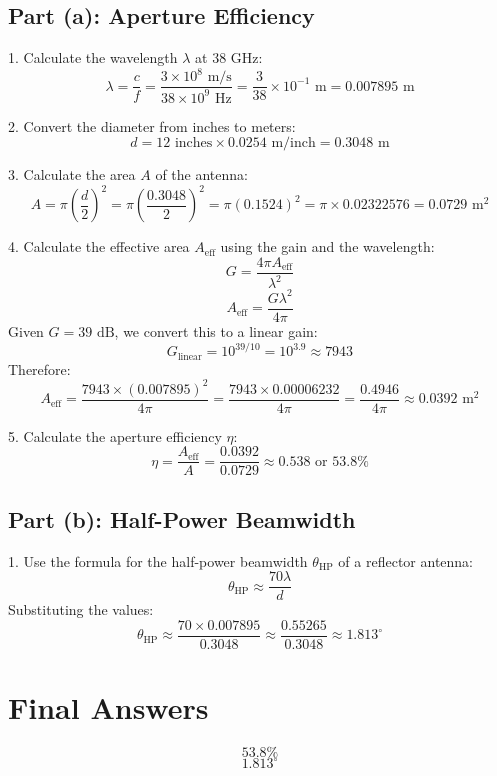 \documentclass[cn,12pt]{homework}
\begin{document}
\begin{solution}
\subsection*{Part (a): Aperture Efficiency}

1. Calculate the wavelength \( \lambda \) at 38 GHz:
\[ \lambda = \frac{c}{f} = \frac{3 \times 10^8 \text{ m/s}}{38 \times 10^9 \text{ Hz}} = \frac{3}{38} \times 10^{-1} \text{ m} = 0.007895 \text{ m} \]

2. Convert the diameter from inches to meters:
\[ d = 12 \text{ inches} \times 0.0254 \text{ m/inch} = 0.3048 \text{ m} \]

3. Calculate the area \( A \) of the antenna:
\[ A = \pi \left( \frac{d}{2} \right)^2 = \pi \left( \frac{0.3048}{2} \right)^2 = \pi \left( 0.1524 \right)^2 = \pi \times 0.02322576 = 0.0729 \text{ m}^2 \]

4. Calculate the effective area \( A_{\text{eff}} \) using the gain and the wavelength:
\[ G = \frac{4\pi A_{\text{eff}}}{\lambda^2} \]
\[ A_{\text{eff}} = \frac{G \lambda^2}{4\pi} \]
Given \( G = 39 \text{ dB} \), we convert this to a linear gain:
\[ G_{\text{linear}} = 10^{39/10} = 10^{3.9} \approx 7943 \]
Therefore:
\[ A_{\text{eff}} = \frac{7943 \times (0.007895)^2}{4\pi} = \frac{7943 \times 0.00006232}{4\pi} = \frac{0.4946}{4\pi} \approx 0.0392 \text{ m}^2 \]

5. Calculate the aperture efficiency \( \eta \):
\[ \eta = \frac{A_{\text{eff}}}{A} = \frac{0.0392}{0.0729} \approx 0.538 \text{ or } 53.8\% \]

\subsection*{Part (b): Half-Power Beamwidth}

1. Use the formula for the half-power beamwidth \( \theta_{\text{HP}} \) of a reflector antenna:
\[ \theta_{\text{HP}} \approx \frac{70 \lambda}{d} \]
Substituting the values:
\[ \theta_{\text{HP}} \approx \frac{70 \times 0.007895}{0.3048} \approx \frac{0.55265}{0.3048} \approx 1.813^\circ \]

\section*{Final Answers}
\[ \boxed{53.8\%} \]
\[ \boxed{1.813^\circ} \]
\end{solution}
\newpage
\end{document}
